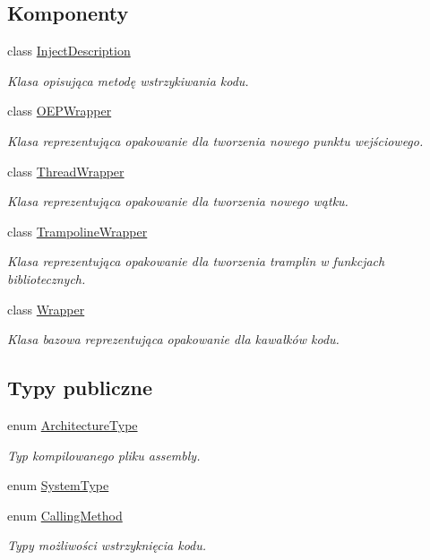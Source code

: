 \subsection*{Komponenty}
\begin{DoxyCompactItemize}
\item 
class \hyperlink{class_d_adding_methods_1_1_inject_description}{Inject\-Description}
\begin{DoxyCompactList}\small\item\em Klasa opisująca metodę wstrzykiwania kodu. \end{DoxyCompactList}\item 
class \hyperlink{class_d_adding_methods_1_1_o_e_p_wrapper}{O\-E\-P\-Wrapper}
\begin{DoxyCompactList}\small\item\em Klasa reprezentująca opakowanie dla tworzenia nowego punktu wejściowego. \end{DoxyCompactList}\item 
class \hyperlink{class_d_adding_methods_1_1_thread_wrapper}{Thread\-Wrapper}
\begin{DoxyCompactList}\small\item\em Klasa reprezentująca opakowanie dla tworzenia nowego wątku. \end{DoxyCompactList}\item 
class \hyperlink{class_d_adding_methods_1_1_trampoline_wrapper}{Trampoline\-Wrapper}
\begin{DoxyCompactList}\small\item\em Klasa reprezentująca opakowanie dla tworzenia tramplin w funkcjach bibliotecznych. \end{DoxyCompactList}\item 
class \hyperlink{class_d_adding_methods_1_1_wrapper}{Wrapper}
\begin{DoxyCompactList}\small\item\em Klasa bazowa reprezentująca opakowanie dla kawałków kodu. \end{DoxyCompactList}\end{DoxyCompactItemize}
\subsection*{Typy publiczne}
\begin{DoxyCompactItemize}
\item 
enum \hyperlink{class_d_adding_methods_a7d062c443c04f37689dbececc36cf4a3}{Architecture\-Type} 
\begin{DoxyCompactList}\small\item\em Typ kompilowanego pliku assembly. \end{DoxyCompactList}\item 
enum \hyperlink{class_d_adding_methods_a14e87405d457c7c3671eca0e74b3f327}{System\-Type} 
\item 
enum \hyperlink{class_d_adding_methods_a8b52c07f1794d8c6cdd6f9b98be2bbf0}{Calling\-Method} 
\begin{DoxyCompactList}\small\item\em Typy możliwości wstrzyknięcia kodu. \end{DoxyCompactList}\end{DoxyCompactItemize}
